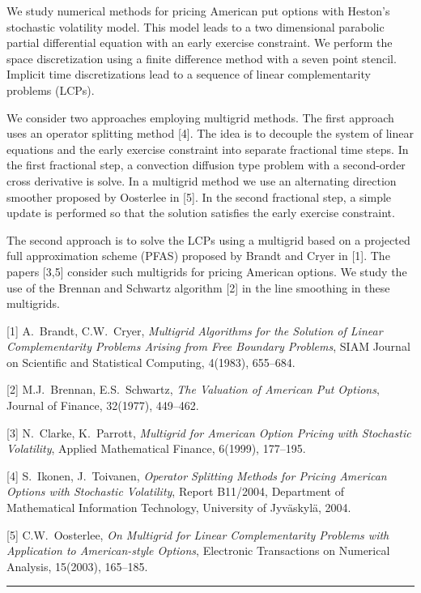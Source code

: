 \documentclass[twosided]{report}
\begin{document}
We study numerical methods for pricing American put options with
Heston's stochastic volatility model. This model leads to a two
dimensional parabolic partial differential equation with an early
exercise constraint. We perform the space discretization using a finite
difference method with a seven point stencil. Implicit time
discretizations lead to a sequence of linear complementarity problems
(LCPs).

We consider two approaches employing multigrid methods. The first
approach uses an operator splitting method [4]. The idea is to decouple
the system of linear equations and the early exercise constraint into
separate fractional time steps. In the first fractional step, a
convection diffusion type problem with a second-order cross derivative
is solve. In a multigrid method we use an alternating direction
smoother proposed by Oosterlee in [5]. In the second fractional step, a
simple update is performed so that the solution satisfies the early
exercise constraint.

The second approach is to solve the LCPs using a multigrid based on a
projected full approximation scheme (PFAS) proposed by Brandt and Cryer
in [1]. The papers [3,5] consider such multigrids for pricing American
options. We study the use of the Brennan and Schwartz algorithm [2] in
the line smoothing in these multigrids.

[1] A.~Brandt, C.W.~Cryer,
{\em Multigrid Algorithms for the Solution of
Linear Complementarity Problems Arising from Free Boundary Problems},
SIAM Journal on Scientific and Statistical Computing, 4(1983), 655--684.

[2] M.J.~Brennan, E.S.~Schwartz,
{\em The Valuation of American Put Options},
Journal of Finance, 32(1977), 449--462.

[3] N.~Clarke, K.~Parrott,
{\em Multigrid for American Option Pricing with
Stochastic Volatility}, Applied Mathematical Finance, 6(1999), 177--195.

[4] S.~Ikonen, J.~Toivanen,
{\em Operator Splitting Methods for Pricing
American Options with Stochastic Volatility}, Report B11/2004,
Department of Mathematical Information Technology, University of
Jyv\"{a}skyl\"{a}, 2004.

[5] C.W.~Oosterlee,
{\em On Multigrid for Linear Complementarity Problems
with Application to American-style Options}, Electronic Transactions on
Numerical Analysis, 15(2003), 165--185.


\begin{center} \rule{6in}{1pt} \end{center}
\end{document}
